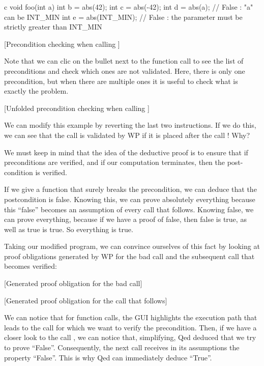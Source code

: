 \begin{CodeBlock}{c}
void foo(int a){
   int b = abs(42);
   int c = abs(-42);
   int d = abs(a);       // False : "a" can be INT_MIN
   int e = abs(INT_MIN); // False : the parameter must be strictly greater than INT_MIN
}
\end{CodeBlock}



[Precondition checking when calling ]

Note that we can clic on the bullet next to the function call to see the
list of preconditions and check which ones are not validated. Here, there is
only one precondition, but when there are multiple ones it is useful to check
what is exactly the problem.

[Unfolded precondition checking when calling ]


We can modify this example by reverting the last two instructions. If we
do this, we can see that the call  is validated by WP if
it is placed after the call ! Why?



We must keep in mind that the idea of the deductive proof is to ensure
that if preconditions are verified, and if our computation terminates,
then the post-condition is verified.



If we give a function that surely breaks the precondition, we can deduce
that the postcondition is false. Knowing this, we can prove absolutely
everything because this ``false'' becomes an assumption of every call
that follows. Knowing false, we can prove everything, because if we have
a proof of false, then false is true, as well as true is true. So
everything is true.



Taking our modified program, we can convince ourselves of this fact by
looking at proof obligations generated by WP for the bad call and the
subsequent call that becomes verified:



[Generated proof obligation for the bad call]


[Generated proof obligation for the call that follows]


We can notice that for function calls, the GUI highlights the execution
path that leads to the call for which we want to verify the precondition.
Then, if we have a closer look to the call , we
can notice that, simplifying, Qed deduced that we try to prove
``False''. Consequently, the next call  receives in its
assumptions the property ``False''. This is why Qed can immediately
deduce ``True''.



